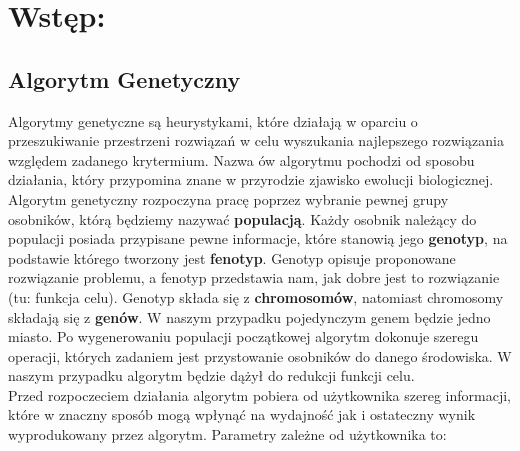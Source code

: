 \section{Wstęp: }
\subsection{Algorytm Genetyczny}
  Algorytmy genetyczne są heurystykami, które działają w oparciu o przeszukiwanie
  przestrzeni rozwiązań w celu wyszukania najlepszego rozwiązania względem
  zadanego krytermium. Nazwa ów algorytmu pochodzi od sposobu działania, który
  przypomina znane w przyrodzie zjawisko ewolucji biologicznej. \\
  Algorytm genetyczny rozpoczyna pracę poprzez wybranie pewnej grupy osobników,
  którą będziemy nazywać \textbf{populacją}. Każdy osobnik należący do populacji
  posiada przypisane pewne informacje, które stanowią jego \textbf{genotyp}, na podstawie
  którego tworzony jest \textbf{fenotyp}. Genotyp opisuje proponowane rozwiązanie problemu, a fenotyp przedstawia nam, jak dobre jest to rozwiązanie 
  (tu: funkcja celu). Genotyp składa się z \textbf{chromosomów}, natomiast chromosomy składają
  się z \textbf{genów}. W naszym przypadku pojedynczym genem będzie jedno miasto. 
  Po wygenerowaniu populacji początkowej algorytm dokonuje szeregu operacji, których zadaniem
  jest przystowanie osobników do danego środowiska. W naszym przypadku algorytm
  będzie dążył do redukcji funkcji celu. \\
  Przed rozpoczeciem działania algorytm pobiera od użytkownika szereg informacji,
  które w znaczny sposób mogą wpłynąć na wydajność jak i ostateczny wynik
  wyprodukowany przez algorytm. Parametry zależne od użytkownika to:
